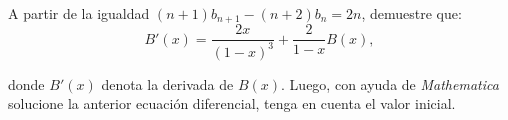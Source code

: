 \item A partir de la igualdad $(n+1)b_{n+1}-(n+2)b_n=2n$, demuestre que:
\begin{equation}
    B'(x)=\frac{2x}{(1-x)^3}+\frac{2}{1-x}B(x),
\end{equation}

donde $B'(x)$ denota la derivada de $B(x)$. Luego, con ayuda de \textit{Mathematica}\textsuperscript{\textregistered} solucione la anterior ecuación diferencial, tenga en cuenta el valor inicial.